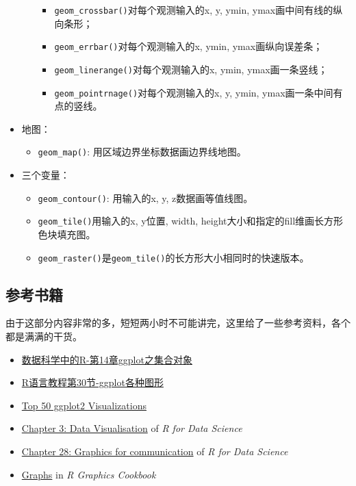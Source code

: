 \documentclass[
]{book}
\providecommand{\tightlist}{%
  \setlength{\itemsep}{0pt}\setlength{\parskip}{0pt}}
\begin{document}
\begin{itemize}
\begin{itemize}
    \begin{itemize}
    \tightlist
    \item
      \texttt{geom\_crossbar()}对每个观测输入的x, y, ymin,
      ymax画中间有线的纵向条形；
    \item
      \texttt{geom\_errbar()}对每个观测输入的x, ymin, ymax画纵向误差条；
    \item
      \texttt{geom\_linerange()}对每个观测输入的x, ymin, ymax画一条竖线；
    \item
      \texttt{geom\_pointrnage()}对每个观测输入的x, y, ymin,
      ymax画一条中间有点的竖线。
    \end{itemize}
  \end{itemize}
\item
  地图：

  \begin{itemize}
  \tightlist
  \item
    \texttt{geom\_map()}: 用区域边界坐标数据画边界线地图。
  \end{itemize}
\item
  三个变量：

  \begin{itemize}
  \item
    \texttt{geom\_contour()}: 用输入的x, y, z数据画等值线图。
  \item
    \texttt{geom\_tile()}用输入的x, y位置, width,
    height大小和指定的fill维画长方形色块填充图。
  \item
    \texttt{geom\_raster()}是\texttt{geom\_tile()}的长方形大小相同时的快速版本。
  \end{itemize}
\end{itemize}

\hypertarget{ux53c2ux8003ux4e66ux7c4d}{%
\subsection{参考书籍}\label{ux53c2ux8003ux4e66ux7c4d}}

由于这部分内容非常的多，短短两小时不可能讲完，这里给了一些参考资料，各个都是满满的干货。

\begin{itemize}
\item
  \href{https://bookdown.org/wangminjie/R4DS/ggplot2-geom.html\#\%E5\%9F\%BA\%E6\%9C\%AC\%E7\%BB\%98\%E5\%9B\%BE}{数据科学中的R-第14章ggplot之集合对象}
\item
  \href{https://www.math.pku.edu.cn/teachers/lidf/docs/Rbook/html/_Rbook/ggplotvis.html}{R语言教程第30节-ggplot各种图形}
\item
  \href{http://r-statistics.co/Top50-Ggplot2-Visualizations-MasterList-R-Code.html}{Top 50 ggplot2
  Visualizations}
\item
  \href{http://r4ds.had.co.nz/data-visualisation.html}{Chapter 3: Data
  Visualisation} of \emph{R
  for Data Science}
\item
  \href{http://r4ds.had.co.nz/graphics-for-communication.html}{Chapter 28: Graphics for
  communication}
  of \emph{R for Data Science}
\item
  \href{https://r-graphics.org/}{Graphs} in \emph{R Graphics Cookbook}
\end{itemize}
\end{document}
